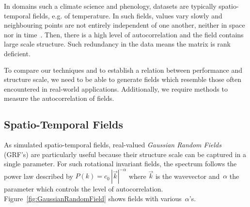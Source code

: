 \documentclass[ijgi,article,submit,moreauthors,pdftex,10pt,a4paper]{Definitions/mdpi}
\begin{document}

In domains such a climate science and phenology, datasets are typically spatio-temporal fields, e.g. of temperature. In such fields, values vary slowly and neighbouring points are not entirely independent of one another, neither in space nor in time~\cite{Eshel2011}. Then, there is a high level of autocorrelation and the field contains large scale structure. Such redundancy in the data means the matrix is rank deficient.

To compare our techniques and to establish a relation between performance and structure scale, we need to be able to generate fields which resemble those often encountered in real-world applications. Additionally, we require methods to measure the autocorrelation of fields.

\subsection{Spatio-Temporal Fields}
\label{sec:Materials and Methods/Spatio-Temporal Fields}

As simulated spatio-temporal fields, real-valued \textit{Gaussian Random Fields} (GRF's) are particularly useful because their structure scale can be captured in a single parameter. For such rotational invariant fields, the spectrum follows the power law described by $P(k) = c_{0} \, |\vec{k}|^{-\alpha}$ where $\vec{k}$ is the wavevector and~$\alpha$ the parameter which controls the level of autocorrelation. Figure~\ref{fig:GaussianRandomField} shows fields with various~$\alpha$'s.
\end{document}
